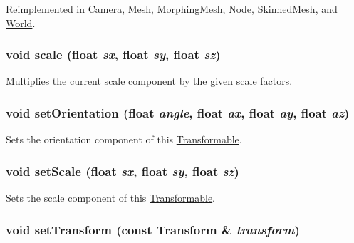 Reimplemented in \hyperlink{classm3g_1_1Camera_1efcb1973989d9963d5bd6d03065d389}{Camera}, \hyperlink{classm3g_1_1Mesh_1efcb1973989d9963d5bd6d03065d389}{Mesh}, \hyperlink{classm3g_1_1MorphingMesh_1efcb1973989d9963d5bd6d03065d389}{MorphingMesh}, \hyperlink{classm3g_1_1Node_1efcb1973989d9963d5bd6d03065d389}{Node}, \hyperlink{classm3g_1_1SkinnedMesh_1efcb1973989d9963d5bd6d03065d389}{SkinnedMesh}, and \hyperlink{classm3g_1_1World_1efcb1973989d9963d5bd6d03065d389}{World}.\hypertarget{classm3g_1_1Transformable_d94deaf828db5e2dfd5e40db42b64cd9}{
\subsubsection[{scale}]{\setlength{\rightskip}{0pt plus 5cm}void scale (float {\em sx}, \/  float {\em sy}, \/  float {\em sz})}}
\label{classm3g_1_1Transformable_d94deaf828db5e2dfd5e40db42b64cd9}


Multiplies the current scale component by the given scale factors. \hypertarget{classm3g_1_1Transformable_980a9a2b5f6102763042e616d3aa4606}{
\subsubsection[{setOrientation}]{\setlength{\rightskip}{0pt plus 5cm}void setOrientation (float {\em angle}, \/  float {\em ax}, \/  float {\em ay}, \/  float {\em az})}}
\label{classm3g_1_1Transformable_980a9a2b5f6102763042e616d3aa4606}


Sets the orientation component of this \hyperlink{classm3g_1_1Transformable}{Transformable}. \hypertarget{classm3g_1_1Transformable_937d04042c25021532ea2532fe5e3a32}{
\subsubsection[{setScale}]{\setlength{\rightskip}{0pt plus 5cm}void setScale (float {\em sx}, \/  float {\em sy}, \/  float {\em sz})}}
\label{classm3g_1_1Transformable_937d04042c25021532ea2532fe5e3a32}


Sets the scale component of this \hyperlink{classm3g_1_1Transformable}{Transformable}. \hypertarget{classm3g_1_1Transformable_05052269aaf19775f3ff1a10d042777e}{
\subsubsection[{setTransform}]{\setlength{\rightskip}{0pt plus 5cm}void setTransform (const {\bf Transform} \& {\em transform})}}
\label{classm3g_1_1Transformable_05052269aaf19775f3ff1a10d042777e}


